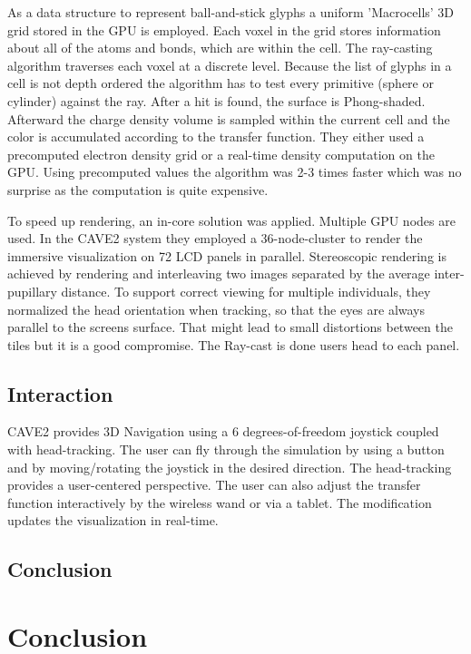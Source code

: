 \documentclass[10pt,twocolumn,letterpaper]{article}
\begin{document}
As a data structure to represent ball-and-stick glyphs a uniform 'Macrocells' 3D grid stored in the GPU is employed. Each voxel in the grid stores information about all of the atoms and bonds, which are within the cell. The ray-casting algorithm \cite{Amanatides87afast} traverses each voxel at a discrete level. Because the list of glyphs in a cell is not depth ordered the algorithm has to test every primitive (sphere or cylinder) against the ray. After a hit is found, the surface is Phong-shaded. Afterward the charge density volume is sampled within the current cell and the color is accumulated according to the transfer function. They either used a precomputed electron density grid or a real-time density computation on the GPU. Using precomputed values the algorithm was 2-3 times faster which was no surprise as the computation is quite expensive.

To speed up rendering, an in-core solution was applied. Multiple GPU nodes are used. In the CAVE2 \cite{febretti2013cave2} system they employed a 36-node-cluster to render the immersive visualization on 72 LCD panels in parallel. Stereoscopic rendering is achieved by rendering and interleaving two images separated by the average inter-pupillary distance. To support correct viewing for multiple individuals, they normalized the head orientation when tracking, so that the eyes are always parallel to the screens surface. That might lead to small distortions between the tiles but it is a good compromise. The Ray-cast is done users head to each panel.



\subsection{Interaction}
CAVE2 \cite{febretti2013cave2} provides 3D Navigation using a 6 degrees-of-freedom joystick coupled with head-tracking. The user can fly through the simulation by using a button and by moving/rotating the joystick in the desired direction. The head-tracking provides a user-centered perspective. The user can also adjust the transfer function interactively by the wireless wand or via a tablet. The modification updates the visualization in real-time.

\subsection{Conclusion}

\section{Conclusion}

{\small


}
\end{document}
